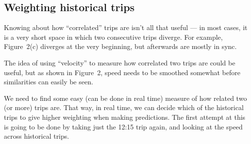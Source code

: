\documentclass[11pt]{article}\usepackage[]{graphicx}\usepackage[]{color}
\begin{document}



\subsection{Weighting historical trips}
\label{sec:weighting_trips}

Knowing about how ``correlated'' trips are isn't all that useful ---
in most cases, it is a very short space in which two consecutive trips diverge.
For example, Figure~2(c) diverges at the very beginning,
but afterwards are mostly in sync.

The idea of using ``velocity'' to measure how correlated two trips are could be useful,
but as shown in Figure~2, speed needs to be smoothed somewhat before similarities 
can easily be seen.

We need to find some easy (can be done in real time) measure of how related two (or more)
trips are.
That way, in real time, we can decide which of the historical trips to give higher weighting
when making predictions.
The first attempt at this is going to be done by taking just the 12:15 trip again,
and looking at the speed across historical trips.
\end{document}
